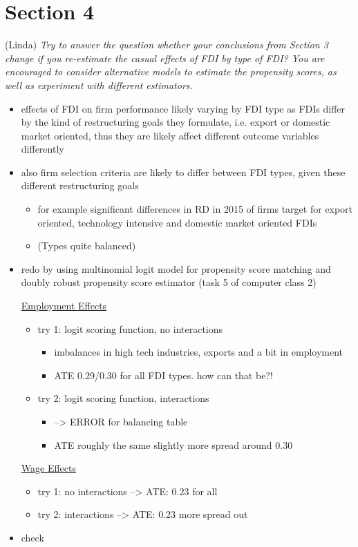 \documentclass[11pt,a4paper,leqno]{article}
\begin{document}
\section*{Section 4} (Linda)
\textit{Try to answer the question whether your conclusions from Section 3 change if you re-estimate the casual effects of FDI by type of FDI? You are encouraged to consider alternative models to estimate the propensity scores, as well as experiment with different estimators.}

\begin{itemize}
	\item effects of FDI on firm performance likely varying by FDI type as FDIs differ by the kind of restructuring goals they formulate, i.e. export or domestic market oriented, thus they are likely affect different outcome variables differently
	\item also firm selection criteria are likely to differ between FDI types, given these different restructuring goals 
	\begin{itemize}
		\item for example significant differences in RD in 2015 of firms target for export oriented, technology intensive and domestic market oriented FDIs
		\item (Types quite balanced)
	\end{itemize}
	\item redo by using multinomial logit model for propensity score matching and doubly robust propensity score estimator (task 5 of computer class 2)
	
	\underline{Employment Effects}
	\begin{itemize}
		\item try 1: logit scoring function, no interactions
		\begin{itemize}
			\item imbalances in high tech industries, exports and a bit in employment
			\item ATE 0.29/0.30 for all FDI types. how can that be?!
		\end{itemize}
		\item try 2: logit scoring function, interactions 
		\begin{itemize}
			\item --> ERROR for balancing table
			\item ATE roughly the same slightly more spread around 0.30
		\end{itemize}	 
	\end{itemize}

	\underline{Wage Effects}
	\begin{itemize}
		\item try 1: no interactions --> ATE: 0.23 for all
		\item try 2: interactions --> ATE: 0.23 more spread out
	\end{itemize}
	\item check 
\end{itemize}
\end{document}
